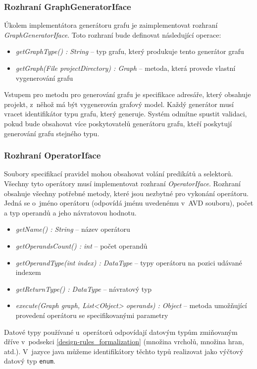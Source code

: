\subsubsection{Rozhraní GraphGeneratorIface}
Úkolem implementátora generátoru grafu je zaimplementovat rozhraní \emph{GraphGeneratorIface}. Toto rozhraní bude definovat následující operace:
\begin{itemize}
\item \emph{getGraphType() : String} -- typ grafu, který produkuje tento generátor grafu
\item \emph{getGraph(File projectDirectory) : Graph} -- metoda, která provede vlastní vygenerování grafu
\end{itemize}

Vstupem pro metodu pro generování grafu je specifikace adresáře, který obsahuje projekt, z~něhož má být vygenerován grafový model. Každý generátor musí vracet identifikátor typu grafu, který generuje. Systém odmítne spustit validaci, pokud bude obsahovat více poskytovatelů generátoru grafu, kteří poskytují generování grafu stejného typu.

\subsubsection{Rozhraní OperatorIface}
Soubory specifikací pravidel mohou obsahovat volání predikátů a selektorů. Všechny tyto operátory musí implementovat rozhraní \emph{OperatorIface}. Rozhraní obsahuje všechny potřebné metody, které jsou nezbytné pro vykonání operátoru. Jedná se o~jméno operátoru (odpovídá jménu uvedenému v~AVD souboru), počet a typ operandů a jeho návratovou hodnotu.

\begin{itemize}
\item \emph{getName() : String} -- název operátoru
\item \emph{getOperandsCount() : int} -- počet operandů
\item \emph{getOperandType(int index) : DataType} -- typy operátoru na pozici udávané indexem
\item \emph{getReturnType() : DataType} -- návratový typ
\item \emph{execute(Graph graph, List<Object> operands) : Object} -- metoda umožňující provedení operátoru se specifikovanými parametry
\end{itemize}

Datové typy používané u~operátorů odpovídají datovým typům zmiňovaným dříve v~podsekci \ref{design-rules_formalization} (množina vrcholů, množina hran, atd.). V~jazyce java můžeme identifikátory těchto typů realizovat jako výčtový datový typ \verb-enum-.

